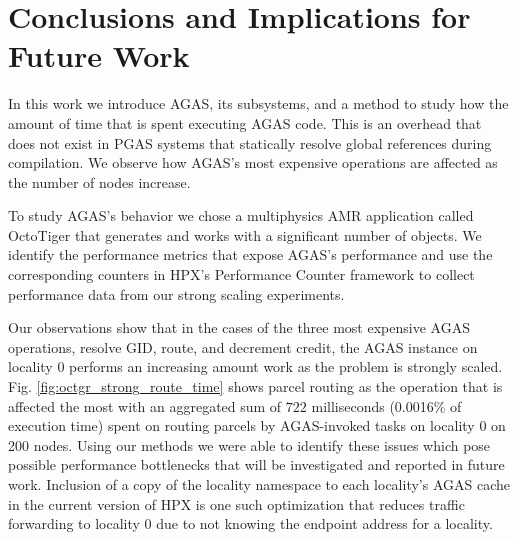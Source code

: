 \section{Conclusions and Implications for Future Work}
\label{conclusions}

%

In this work we introduce AGAS, its subsystems, and a method to study how the
amount of time that is spent executing AGAS code. This is an overhead that does
not exist in PGAS systems that statically resolve global references during
compilation. We observe how AGAS's most expensive operations are affected as
the number of nodes increase.

To study AGAS's behavior we chose a multiphysics AMR application called
OctoTiger that generates and works with a significant number of objects. We
identify the performance metrics that expose AGAS's performance and use the
corresponding counters in HPX's Performance Counter framework to collect
performance data from our strong scaling experiments.

Our observations show that in the cases of the three most expensive AGAS operations, resolve
GID, route, and decrement credit, the AGAS instance on locality 0 performs an
increasing amount work as the problem is strongly scaled. Fig.
\ref{fig:octgr_strong_route_time} shows parcel routing as the operation that is
affected the most with an aggregated sum of $722$ milliseconds (0.0016\% of
execution time) spent on routing parcels by AGAS-invoked tasks on locality 0 on
200 nodes. Using our methods we were able to identify these issues which pose possible
performance bottlenecks that will be investigated and reported in future work. Inclusion of a copy
of the locality namespace to each locality's AGAS cache in the current version
of HPX is one such optimization that reduces traffic forwarding to locality 0
due to not knowing the endpoint address for a locality.

